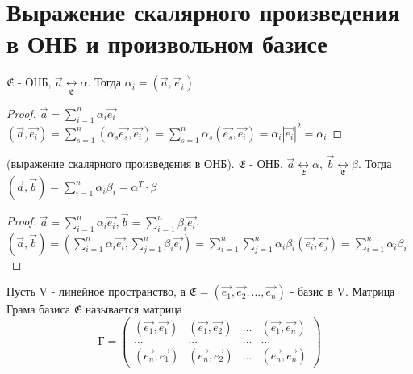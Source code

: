 \section{Выражение скалярного произведения в ОНБ и произвольном базисе}
\begin{proposition}
	\(\mathfrak{E}\) - ОНБ, \(\vec{a}\underset{\mathfrak{E}}{\longleftrightarrow}\alpha\). Тогда \(\alpha_i = (\vec{a}, \vec{e}_i)\)
\end{proposition}
\begin{proof}
	\(\vec{a} = \sum_{i = 1}^{n}\alpha_i\vec{e_i}\) \\[5mm]
	\((\vec{a}, \vec{e_i}) = \sum_{s = 1}^{n}(\alpha_s\vec{e_s}, \vec{e_i}) = \sum_{s = 1}^{n}\alpha_s(\vec{e_s}, \vec{e_i}) = \alpha_i|\vec{e_i}|^2 = \alpha_i\)
\end{proof}
\begin{theorem}
	(выражение скалярного произведения в ОНБ). 
	\(\mathfrak{E}\) - ОНБ, \(\vec{a}\underset{\mathfrak{E}}{\longleftrightarrow}\alpha\), 
	\(\vec{b}\underset{\mathfrak{E}}{\longleftrightarrow}\beta\). Тогда \((\vec{a}, \vec{b}) = \sum_{i = 1}^{n}\alpha_i\beta_i = \alpha^T\cdot\beta\)
\end{theorem}
\begin{proof}
	\(\vec{a} = \sum_{i = 1}^{n}\alpha_i\vec{e_i}, \vec{b} = \sum_{i = 1}^{n}\beta_i\vec{e_i}\). \\[5mm]
	\((\vec{a}, \vec{b}) = (\sum_{i = 1}^{n}\alpha_i\vec{e_i}, \sum_{j = 1}^{n}\beta_i\vec{e_i}) = \sum_{i = 1}^{n}\sum_{j = 1}^{n}\alpha_i\beta_i(\vec{e_i}, \vec{e_j}) = \sum_{i = 1}^{n}\alpha_i\beta_i\)
\end{proof}
\begin{definition}
	Пусть V - линейное пространство, а \(\mathfrak{E} = (\vec{e_1}, \vec{e_2}, \ldots, \vec{e_n})\) - базис в V. Матрица Грама базиса \(\mathfrak{E}\) называется матрица 
	\[ 
	\text{Г} = 
	\begin{pmatrix}
		(\vec{e_1}, \vec{e_1}) & (\vec{e_1}, \vec{e_2}) & \ldots & (\vec{e_1}, \vec{e_n}) \\
		\ldots & \ldots & \ldots & \ldots \\
		(\vec{e_n}, \vec{e_1}) & (\vec{e_n}, \vec{e_2}) & \ldots & (\vec{e_n}, \vec{e_n})
	\end{pmatrix}
	\]
\end{definition}

